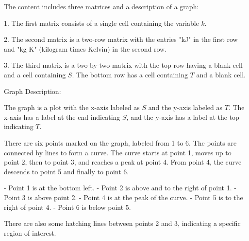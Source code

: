 The content includes three matrices and a description of a graph:

1. The first matrix consists of a single cell containing the variable \( k \).

2. The second matrix is a two-row matrix with the entries "kJ" in the first row and "kg \cdot K" (kilogram times Kelvin) in the second row.

3. The third matrix is a two-by-two matrix with the top row having a blank cell and a cell containing \( S \). The bottom row has a cell containing \( T \) and a blank cell.

Graph Description:

The graph is a plot with the x-axis labeled as \( S \) and the y-axis labeled as \( T \). The x-axis has a label at the end indicating \( S \), and the y-axis has a label at the top indicating \( T \). 

There are six points marked on the graph, labeled from 1 to 6. The points are connected by lines to form a curve. The curve starts at point 1, moves up to point 2, then to point 3, and reaches a peak at point 4. From point 4, the curve descends to point 5 and finally to point 6.

- Point 1 is at the bottom left.
- Point 2 is above and to the right of point 1.
- Point 3 is above point 2.
- Point 4 is at the peak of the curve.
- Point 5 is to the right of point 4.
- Point 6 is below point 5.

There are also some hatching lines between points 2 and 3, indicating a specific region of interest.